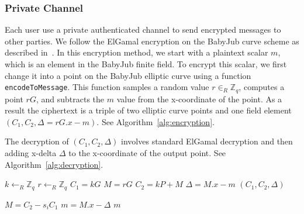 \documentclass[runningheads]{llncs}
\begin{document}
\subsubsection{Private Channel}

Each user use a private authenticated channel to send encrypted messages to other parties. We follow the ElGamal encryption on the BabyJub curve scheme as described in~\cite{ElGamalEncryptionDecryption2020,jieWeijiekohElgamalbabyjub2023}.  In this encryption method, we start with a plaintext scalar $m$, which is an element in the BabyJub finite field. To encrypt this scalar, we first change it into a point on the BabyJub elliptic curve using a function \texttt{encodeToMessage}. This function samples a random value \( r \in_{R} \mathbb{Z}_q\), computes a point \( rG \), and subtracts the $m$ value from the x-coordinate of the point. As a result the ciphertext is a triple of two elliptic curve points and one field element $(C_1, C_2, \Delta=rG.x - m)$. See Algorithm~\ref{alg:encryption}.

The decryption of $(C_1, C_2, \Delta)$ involves standard ElGamal decryption and then adding x-delta $\Delta$ to the x-coordinate of the output point. See Algorithm~\ref{alg:decryption}.

\begin{algorithm}
    \caption{$\texttt{Enc}_{P_i}$}
    \label{alg:encryption}
    
    
    $k \gets_R \mathbb{Z}_q$\;
    $r \gets_R \mathbb{Z}_q$\;
    $C_1 = kG$\;
    $M = rG$\;
    $C_2 = kP + M$\;
    $\Delta = M.x - m$\;
    \Return $(C_1, C_2, \Delta)$
\end{algorithm}

\begin{algorithm}
    \caption{$\texttt{Dec}_{s_i}$}
    \label{alg:decryption}
    
    
    $M = C_2 - s_i C_1$\;
    $m = M.x - \Delta$\;
    \Return $m$
\end{algorithm}
\end{document}
